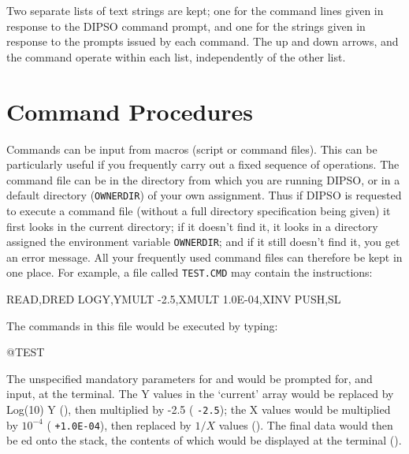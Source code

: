 \documentclass[twoside,11pt,noabs,nolof]{starlink}
\begin{document}
Two separate lists of text strings are kept; one for the command lines
given in response to the DIPSO command prompt, and one for the strings
given in response to the prompts issued by each command. The up and down
arrows, and the   command operate within each list, independently
of the other list.

\section {Command Procedures}

Commands can be input from macros (script or command files). This can
be particularly useful if you frequently carry out a fixed sequence of
operations. The command file can be in the directory from which you
are running DIPSO, or in a default directory ({\texttt{OWNERDIR}})  of your own
assignment. Thus if DIPSO is requested to execute a command file
(without a full directory specification being given) it first looks in
the current directory; if it doesn't find it, it looks in a directory
assigned the environment variable {\texttt{OWNERDIR}};  and if it
still doesn't find it, you get an error message. All your frequently
used command files can therefore be kept in one place. For example, a
file called {\texttt{TEST.CMD}}  may contain the instructions:

\begin{terminalv}
READ,DRED
LOGY,YMULT -2.5,XMULT 1.0E-04,XINV
PUSH,SL
\end{terminalv}

The commands in this file would be executed by typing:

\begin{terminalv}
@TEST
\end{terminalv}

The unspecified mandatory parameters for 
and   would be prompted for, and input, at
the terminal. The Y values in the `current' array would be replaced by
Log(10) Y (),  then multiplied by -2.5
(  {\texttt{-2.5}});  the X values would be multiplied
by $10^{-4}$ (  {\texttt{+1.0E-04}}),  then replaced
by $1/X$ values ().  The final data
would then be ed  onto the stack, the
contents of which would be displayed at the terminal ().
\end{document}
